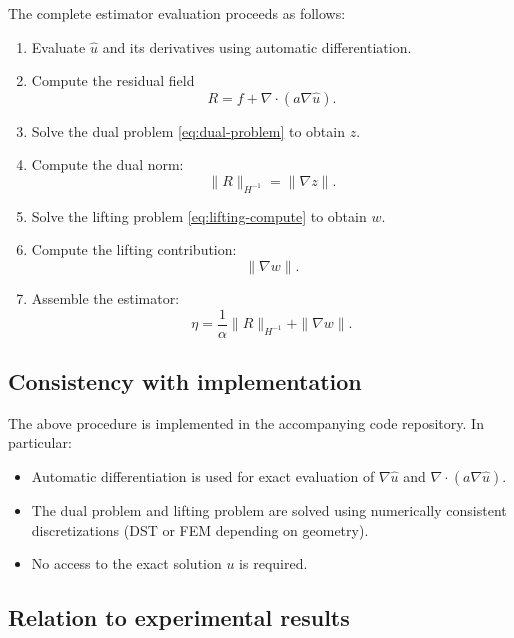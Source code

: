 The complete estimator evaluation proceeds as follows:

\begin{enumerate}[leftmargin=*]

\item Evaluate $\hat{u}$ and its derivatives using automatic differentiation.

\item Compute the residual field
\[
R = f + \nabla \cdot (a \nabla \hat{u}).
\]

\item Solve the dual problem \eqref{eq:dual-problem} to obtain $z$.

\item Compute the dual norm:
\[
\|R\|_{H^{-1}} = \|\nabla z\|.
\]

\item Solve the lifting problem \eqref{eq:lifting-compute} to obtain $w$.

\item Compute the lifting contribution:
\[
\|\nabla w\|.
\]

\item Assemble the estimator:
\[
\eta = \frac{1}{\alpha}\|R\|_{H^{-1}} + \|\nabla w\|.
\]

\end{enumerate}

\subsection{Consistency with implementation}

The above procedure is implemented in the accompanying code repository.
In particular:

\begin{itemize}
\item Automatic differentiation is used for exact evaluation of
$\nabla \hat{u}$ and $\nabla \cdot (a \nabla \hat{u})$.

\item The dual problem and lifting problem are solved using
numerically consistent discretizations (DST or FEM depending on geometry).

\item No access to the exact solution $u$ is required.
\end{itemize}

\subsection{Relation to experimental results}

